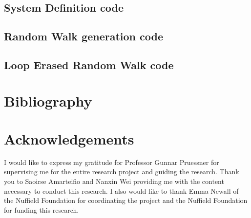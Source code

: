 \documentclass{article}
\begin{document}
	\subsection{System Definition code} \label{sssec:sysdef}
	
	\subsection{Random Walk generation code} \label{sssec:srwgen}
	
	\subsection{Loop Erased Random Walk code} \label{sssec:lerw}
	


\section{Bibliography}	
	
	
	

\section{Acknowledgements}
I would like to express my gratitude for Professor Gunnar Pruessner for supervising me for the entire research project and guiding the research. Thank you to Saoirse Amarteifio and Nanxin Wei providing me with the content necessary to conduct this research. I also would like to thank Emma Newall of the Nuffield Foundation for coordinating the project and the Nuffield Foundation for funding this research.
\end{document}
